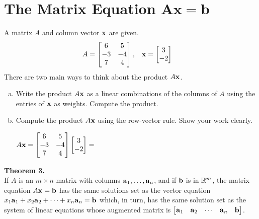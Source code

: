 \clearpage
\newpage


\section{The Matrix Equation $\boldsymbol{Ax=b}$}
\name[2.25in]

\begin{exercise} %
	A matrix $A$ and column vector $\boldsymbol{\mathbf{x}}$ are given.
	\begin{align*}
	A &= \begin{bmatrix}6&5\\-3&-4\\7&4\end{bmatrix}, &
	\boldsymbol{\mathbf{x}} &= \begin{bmatrix}3\\-2\end{bmatrix}
	\end{align*}
	There are two main ways to think about the product $A\boldsymbol{\mathbf{x}}$.
	\begin{multicols}{2}
		\begin{enumerate}[(a)]
			\item Write the product $A\boldsymbol{\mathbf{x}}$ as a linear combinations of the columns of $A$ using the entries of $\boldsymbol{\mathbf{x}}$ as weights. Compute the product.
			\columnbreak
			\item Compute the product $A\boldsymbol{\mathbf{x}}$ using the row-vector rule. Show your work clearly. \par
			$ A\boldsymbol{\mathbf{x}} = \begin{bmatrix}6&5\\-3&-4\\7&4\end{bmatrix}\begin{bmatrix}3\\-2\end{bmatrix} = $
		\end{enumerate}
	\end{multicols}
\end{exercise}
\vfill

\begin{boxthm}
	\textbf{Theorem 3.} \\
	If $A$ is an $m\times n$ matrix with columns $\boldsymbol{\mathbf{a}}_1,\ldots,\boldsymbol{\mathbf{a}}_n$, and if $\boldsymbol{\mathbf{b}}$ is in $\mathbb{R}^m$, the matrix equation $A\boldsymbol{\mathbf{x}}=\boldsymbol{\mathbf{b}}$ has the same solutions set as the vector equation $x_1\boldsymbol{\mathbf{a}}_1+x_2\boldsymbol{\mathbf{a}}_2+\cdots+x_n\boldsymbol{\mathbf{a}}_n=\boldsymbol{\mathbf{b}}$ which, in turn, has the same solution set as the system of linear equations whose augmented matrix is $\begin{bmatrix}\boldsymbol{\mathbf{a}}_1&\boldsymbol{\mathbf{a}}_2&\cdots&\boldsymbol{\mathbf{a}}_n&\boldsymbol{\mathbf{b}}\end{bmatrix}$.
\end{boxthm}

